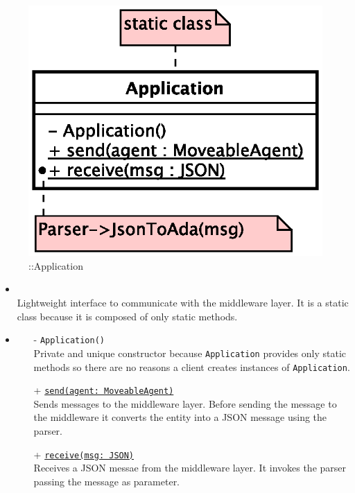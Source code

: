 \begin{figure}[h]
\centering
\includegraphics[scale=0.6,keepaspectratio]{images/solution/app/backend/application.eps}
\caption{\pInterface::Application}
\label{fig:sd-app-application}
\end{figure}
\FloatBarrier
\begin{itemize}
  \item \textbf{\descr} \\
    Lightweight interface to communicate with the middleware layer.
    It is a static class because it is composed of only static methods.
  \item \textbf{\ops}
  \begin{itemize}
   \item[-] \texttt{Application()} \\
   Private and unique constructor because \texttt{Application} provides 
   only static methods so there are no reasons a client creates instances 
   of \texttt{Application}.
    \item[+] \texttt{\underline{send(agent: MoveableAgent)}} \\
    Sends messages to the middleware layer. Before sending the message to the
    middleware it converts the entity into a JSON message using the parser.
    \item[+] \texttt{\underline{receive(msg: JSON)}} \\
    Receives a JSON messae from the middleware layer. It invokes the parser 
    passing the message as parameter.
  \end{itemize}
\end{itemize}
